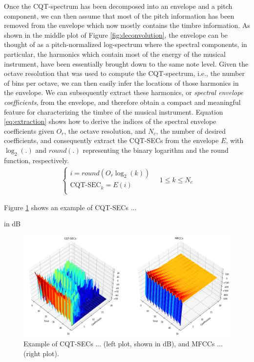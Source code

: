 \documentclass[journal]{IEEEtran}
\begin{document}
Once the CQT-spectrum has been decomposed into an envelope and a pitch component, we can then assume that most of the pitch information has been removed from the envelope which now mostly contains the timbre information. As shown in the middle plot of Figure \ref{fig:deconvolution}, the envelope can be thought of as a pitch-normalized log-spectrum where the spectral components, in particular, the harmonics which contain most of the energy of the musical instrument, have been essentially brought down to the same note level. Given the octave resolution that was used to compute the CQT-spectrum, i.e., the number of bins per octave, we can then easily infer the locations of those harmonics in the envelope. We can subsequently extract these harmonics, or \textit{spectral envelope coefficients}, from the envelope, and therefore obtain a compact and meaningful feature for characterizing the timbre of the musical instrument. Equation \ref{eq:extraction} shows how to derive the indices of the spectral envelope coefficients given $O_r$, the octave resolution, and $N_c$, the number of desired coefficients, and consequently extract the CQT-SECs from the envelope $E$, with $\log_2(.)$ and $round(.)$ representing the binary logarithm and the round function, respectively.
\begin{equation}
\label{eq:extraction}
\begin{split}
\begin{cases}
i = round(O_r \log_2(k)) \\
\text{CQT-SEC}_k = E(i) \\
\end{cases}
\quad 1 \le k \le N_c
\end{split}
\end{equation}

Figure \ref{fig:extraction} shows an example of CQT-SECs ...

in dB

\begin{figure}[htp]
    \centering
    \includegraphics[width=\textwidth]{extraction.png}
    \caption{Example of CQT-SECs ... (left plot, shown in dB), and MFCCs ... (right plot).}
    \label{fig:extraction}
\end{figure}
\end{document}

